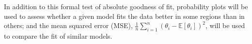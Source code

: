 \documentclass[../../ArchStats.tex]{subfiles}
\begin{document}
In addition to this formal test of absolute goodness of fit, probability plots will be used to assess whether a given model fits the data better in some regions than in others; and the mean squared error (MSE), $\frac{1}{n} \sum_{i=1}^n (\theta_i - \mathbb{E}\left[\theta_i\right])^2$, will be used to compare the fit of similar models.


\end{document}
